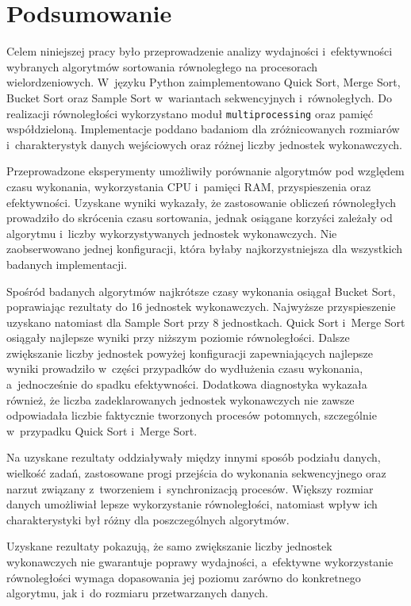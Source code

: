 \cleardoublepage
\chapter{Podsumowanie}
\label{cha:Podsumowanie}

Celem niniejszej pracy było przeprowadzenie analizy wydajności i~efektywności wybranych algorytmów sortowania równoległego na procesorach wielordzeniowych. 
W~języku Python zaimplementowano Quick Sort, Merge Sort, Bucket Sort oraz Sample Sort w~wariantach sekwencyjnych i~równoległych. 
Do realizacji równoległości wykorzystano moduł \texttt{multiprocessing} oraz pamięć współdzieloną.
Implementacje poddano badaniom dla zróżnicowanych rozmiarów i~charakterystyk danych wejściowych oraz różnej liczby jednostek wykonawczych.

Przeprowadzone eksperymenty umożliwiły porównanie algorytmów pod względem czasu wykonania, 
wykorzystania CPU i~pamięci RAM, przyspieszenia oraz efektywności. 
Uzyskane wyniki wykazały, że zastosowanie obliczeń równoległych prowadziło do skrócenia czasu sortowania,
jednak osiągane korzyści zależały od algorytmu i~liczby wykorzystywanych jednostek wykonawczych.
Nie zaobserwowano jednej konfiguracji, która byłaby najkorzystniejsza dla wszystkich badanych implementacji.

Spośród badanych algorytmów najkrótsze czasy wykonania osiągał Bucket Sort, poprawiając rezultaty do 16 jednostek wykonawczych.
Najwyższe przyspieszenie uzyskano natomiast dla Sample Sort przy 8 jednostkach.
Quick Sort i~Merge Sort osiągały najlepsze wyniki przy niższym poziomie równoległości. 
Dalsze zwiększanie liczby jednostek powyżej konfiguracji zapewniających najlepsze wyniki
prowadziło w~części przypadków do wydłużenia czasu wykonania, a~jednocześnie do spadku efektywności.
Dodatkowa diagnostyka wykazała również, że liczba zadeklarowanych jednostek wykonawczych 
nie zawsze odpowiadała liczbie faktycznie tworzonych procesów potomnych, szczególnie w~przypadku Quick Sort i~Merge Sort.

Na uzyskane rezultaty oddziaływały między innymi sposób podziału danych, wielkość zadań, 
zastosowane progi przejścia do wykonania sekwencyjnego oraz narzut związany z~tworzeniem i~synchronizacją procesów.
Większy rozmiar danych umożliwiał lepsze wykorzystanie równoległości, 
natomiast wpływ ich charakterystyki był różny dla poszczególnych algorytmów.

Uzyskane rezultaty pokazują, że samo zwiększanie liczby jednostek wykonawczych nie gwarantuje poprawy wydajności, 
a~efektywne wykorzystanie równoległości wymaga dopasowania jej poziomu zarówno do konkretnego algorytmu, jak i~do rozmiaru przetwarzanych danych.